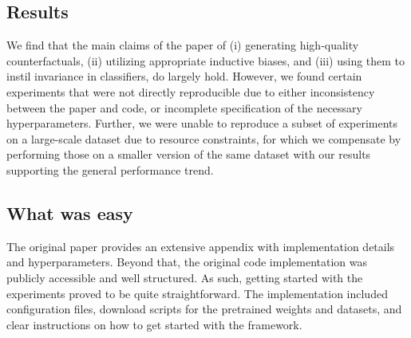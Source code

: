 \subsection*{Results}

We find that the main claims of the paper of
(i) generating high-quality counterfactuals,
(ii) utilizing appropriate inductive biases, and
(iii) using them to instil invariance in classifiers,
do largely hold.
However, we found certain experiments that were not directly reproducible due to either inconsistency between the paper and code, or incomplete specification of the necessary hyperparameters. Further, we were unable to reproduce a subset of experiments on a large-scale dataset due to resource constraints, for which we compensate by performing those on a smaller version of the same dataset with our results supporting the general performance trend.


\subsection*{What was easy}
The original paper provides an extensive appendix with implementation details and hyperparameters. Beyond that, the original code implementation was publicly accessible and well structured. As such, getting started with the experiments proved to be quite straightforward. The implementation included configuration files, download scripts for the pretrained weights and datasets, and clear instructions on how to get started with the framework.

